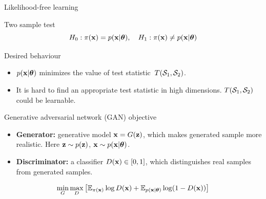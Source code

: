 \begin{frame}{Likelihood-free learning}
	\begin{block}{Two sample test}
		\vspace{-0.5cm}
		\[
			H_0: \pi(\mathbf{x}) = p(\mathbf{x} | \boldsymbol{\theta}), \quad H_1: \pi(\mathbf{x}) \neq p(\mathbf{x} | \boldsymbol{\theta})
		\]
		\vspace{-0.8cm}
	\end{block}
	\begin{block}{Desired behaviour}
		\begin{itemize}
			\item $p(\mathbf{x} | \boldsymbol{\theta})$ minimizes the value of test statistic~$T(\mathcal{S}_1, \mathcal{S}_2)$.
			\item It is hard to find an appropriate test statistic in high dimensions. $T(\mathcal{S}_1, \mathcal{S}_2)$ could be learnable.
		\end{itemize}
	\end{block}
	\vspace{-0.3cm}
	\begin{block}{Generative adversarial network (GAN) objective}
		\begin{itemize}
			\item \textbf{Generator:} generative model $\mathbf{x} = G(\mathbf{z})$, which makes generated sample more realistic. Here $\mathbf{z} \sim p(\mathbf{z})$, $\mathbf{x} \sim p(\mathbf{x} | \boldsymbol{\theta})$.
			\item \textbf{Discriminator:} a classifier $D(\mathbf{x}) \in [0, 1]$, which distinguishes real samples from generated samples.
		\end{itemize}
		\[
			\min_{G} \max_D \left[ \mathbb{E}_{\pi(\mathbf{x})} \log D(\mathbf{x}) + \mathbb{E}_{p(\mathbf{x} | \boldsymbol{\theta})} \log (1 - D(\mathbf{x})) \right]
		\]
	\end{block}
\end{frame}
